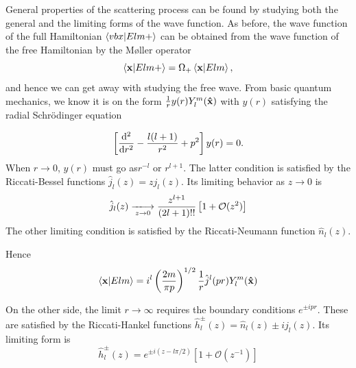 General properties of the scattering process can be found by studying both the
general and the limiting forms of the wave function. As before, the wave
function of the full Hamiltonian
\(\ip{vb{x}}{Elm+}\) can be obtained from the wave function of the free Hamiltonian by the Møller operator
\begin{equation*}
  \ip{\vb{x}}{Elm+} = \Omega_{+}\ip{\vb{x}}{Elm},
\end{equation*}
and hence we can get away with studying the free wave. From basic quantum
mechanics, we know it is on the form
\(\frac{1}{r}y(r)Y^{m}_{l}(\vu{x})\) with \(y(r)\) satisfying the radial
Schr\"odinger equation

\begin{equation*}
  \left[ \dv[2]{r} - \frac{l(l+1)}{r^{2}}+p^{2}\right]y(r) = 0.
\end{equation*}
\newcommand{\rbf}{\hat{j}_l(z)}
When \(r\to 0\), \(y(r)\) must go as\(r^{-l}\) or \(r^{l+1}\). The latter
condition is satisfied by the
Riccati-Bessel functions \(\rbf{} = zj_{l}(z)\). Its limiting behavior as \(z\to
0\) is
\begin{equation*}
  \rbf{} \xlongrightarrow[z\to 0]{} \frac{z^{l+1}}{(2l+1)!!}\left[ 1+\mathcal{O}(z^{2}) \right]
\end{equation*}
The other limiting condition is satisfied by the Riccati-Neumann function
\(\hat{n}_{l}(z)\). 

Hence
\begin{equation}
  \label{eq:xelm}
  \ip{\vb{x}}{Elm} = i^{l}\left( \frac{2m}{\pi p} \right)^{1/2}\frac{1}{r}\hat{j}^{l}(pr)Y^{m}_{l}(\vu{x})
\end{equation}

On the other side, the limit \(r\to\infty\) requires the boundary conditions
\(e^{\pm ipr}\). These are satisfied by the Riccati-Hankel functions
\(\hat{h}_{l}^{\pm}(z) = \hat{n}_{l}(z) \pm ij_{l}(z)\). Its limiting form is
\begin{equation*}
  \hat{h}^{\pm}_{l}(z) = e^{\pm i\left( z-l\pi/2 \right)}\left[ 1+\mathcal{O}(z^{-1}) \right]
\end{equation*}

